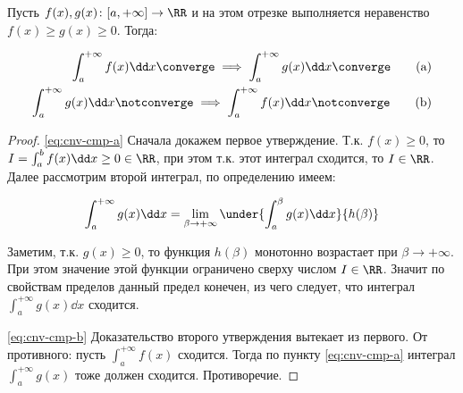 
\begin{theorem}\label{cnv-cmp}
  Пусть \(f(x), g(x) \colon [a, +\infty] \to \RR\) и на этом отрезке выполняется
  неравенство \(f(x) \ge g(x) \ge 0\). Тогда:

  \begin{align}
    \int_{a}^{+\infty} f(x) \dd x \converge
    \implies \int_{a}^{+\infty} g(x) \dd x \converge
    \label{eq:cnv-cmp-a}\tag{a}
    \\
    \int_{a}^{+\infty} g(x) \dd x \notconverge
    \implies \int_{a}^{+\infty} f(x) \dd x \notconverge
    \label{eq:cnv-cmp-b}\tag{b}
  \end{align}
\end{theorem}
\begin{proof}
  \eqref{eq:cnv-cmp-a} Сначала докажем первое утверждение.
  Т.к. \(f(x) \ge 0\), то
  \(I = \int_{a}^{b} f(x) \dd x \ge 0 \in \RR\),
  при этом т.к. этот интеграл сходится, то \(I \in \RR\).
  Далее рассмотрим второй интеграл, по определению имеем:

  \begin{align*}
    \int_{a}^{+\infty} g(x) \dd x
    = \lim_{\beta \to +\infty}
      \under{\int_{a}^{\beta} g(x) \dd x}{h(\beta)}
  \end{align*}

  Заметим, т.к. \(g(x) \ge 0\), то функция \(h(\beta)\) монотонно возрастает при
  \(\beta \to +\infty\). При этом значение этой функции ограничено сверху
  числом \(I \in \RR\). Значит по свойствам пределов данный предел конечен, из
  чего следует, что интеграл \(\int_{a}^{+\infty} g(x) \dd x\) сходится.

  \eqref{eq:cnv-cmp-b} Доказательство второго утверждения вытекает из первого.
  От противного: пусть \(\int_{a}^{+\infty} f(x)\) сходится. Тогда по
  пункту \ref{eq:cnv-cmp-a} интеграл \(\int_{a}^{+\infty} g(x)\) тоже должен
  сходится. Противоречие.
\end{proof}